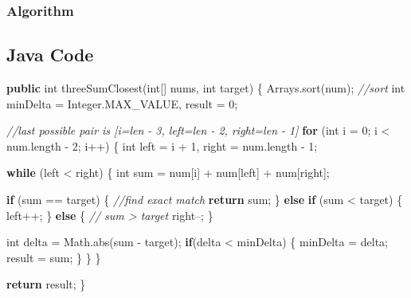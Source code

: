 \documentclass[]{book}
\newenvironment{Shaded}{\begin{snugshade}}{\end{snugshade}}
\newcommand{\BuiltInTok}[1]{#1}
\newcommand{\CommentTok}[1]{\textcolor[rgb]{0.56,0.35,0.01}{\textit{#1}}}
\newcommand{\DataTypeTok}[1]{\textcolor[rgb]{0.13,0.29,0.53}{#1}}
\newcommand{\DecValTok}[1]{\textcolor[rgb]{0.00,0.00,0.81}{#1}}
\newcommand{\FunctionTok}[1]{\textcolor[rgb]{0.00,0.00,0.00}{#1}}
\newcommand{\KeywordTok}[1]{\textcolor[rgb]{0.13,0.29,0.53}{\textbf{#1}}}
\newcommand{\NormalTok}[1]{#1}
\begin{document}
\hypertarget{algorithm-7}{%
\subsubsection{Algorithm}\label{algorithm-7}}

\hypertarget{java-code-5}{%
\subsection{Java Code}\label{java-code-5}}

\begin{Shaded}
\begin{Highlighting}[]
\KeywordTok{public} \DataTypeTok{int} \FunctionTok{threeSumClosest}\NormalTok{(}\DataTypeTok{int}\NormalTok{[] nums, }\DataTypeTok{int}\NormalTok{ target) \{}
    \BuiltInTok{Arrays}\NormalTok{.}\FunctionTok{sort}\NormalTok{(num); }\CommentTok{//sort}
    \DataTypeTok{int}\NormalTok{ minDelta = }\BuiltInTok{Integer}\NormalTok{.}\FunctionTok{MAX_VALUE}\NormalTok{, result = }\DecValTok{0}\NormalTok{;}

    \CommentTok{//last possible pair is [i=len - 3, left=len - 2, right=len - 1]}
    \KeywordTok{for}\NormalTok{ (}\DataTypeTok{int}\NormalTok{ i = }\DecValTok{0}\NormalTok{; i < num.}\FunctionTok{length}\NormalTok{ - }\DecValTok{2}\NormalTok{; i++) \{}
        \DataTypeTok{int}\NormalTok{ left = i + }\DecValTok{1}\NormalTok{, right = num.}\FunctionTok{length}\NormalTok{ - }\DecValTok{1}\NormalTok{;}

        \KeywordTok{while}\NormalTok{ (left < right) \{}
            \DataTypeTok{int}\NormalTok{ sum = num[i] + num[left] + num[right];}

            \KeywordTok{if}\NormalTok{ (sum == target) \{}
                \CommentTok{//find exact match}
                \KeywordTok{return}\NormalTok{ sum;}
\NormalTok{            \} }\KeywordTok{else} \KeywordTok{if}\NormalTok{ (sum < target) \{}
\NormalTok{                left++;}
\NormalTok{            \} }\KeywordTok{else}\NormalTok{ \{}
                \CommentTok{// sum > target}
\NormalTok{                right--;}
\NormalTok{            \}}

            \DataTypeTok{int}\NormalTok{ delta = }\BuiltInTok{Math}\NormalTok{.}\FunctionTok{abs}\NormalTok{(sum - target);}
            \KeywordTok{if}\NormalTok{(delta < minDelta) \{}
\NormalTok{                minDelta = delta;}
\NormalTok{                result = sum;}
\NormalTok{            \}}
\NormalTok{        \}}
\NormalTok{    \}}

    \KeywordTok{return}\NormalTok{ result;}
\NormalTok{\}}
\end{Highlighting}
\end{Shaded}
\end{document}
